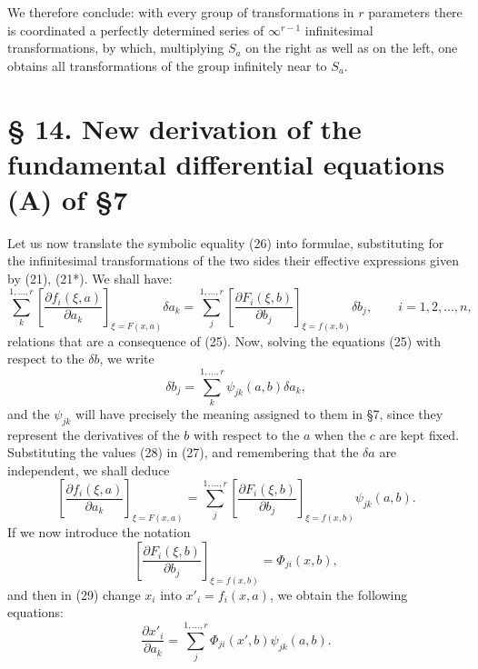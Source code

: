 \documentclass[11pt]{book}
\begin{document}
We therefore conclude: with every group of transformations in $r$ parameters there is coordinated a perfectly determined series of $\infty^{r-1}$ infinitesimal transformations, by which, multiplying $S_a$ on the right as well as on the left, one obtains all transformations of the group infinitely near to $S_a$.

\section*{\S{} 14. New derivation of the fundamental differential equations (A) of \S{}7}

Let us now translate the symbolic equality (26) into formulae, substituting for the infinitesimal transformations of the two sides their effective expressions given by (21), (21*). We shall have:
\begin{equation*}\tag{27}
 \sum\limits_k^{1,\ldots,r}\left[\frac{\partial f_i(\xi,a)}{\partial a_k}\right]_{\xi=F(x,a)}\delta a_k
 =
 \sum\limits_j^{1,\ldots,r}\left[\frac{\partial F_i(\xi,b)}{\partial b_j}\right]_{\xi=f(x,b)}\delta b_j,
 \qquad i=1,2,\ldots,n,
\end{equation*}
relations that are a consequence of (25). Now, solving the equations (25) with respect to the $\delta b$, we write
\begin{equation*}\tag{28}
 \delta b_j=\sum\limits_k^{1,\ldots,r}\psi_{jk}(a,b)\delta a_k,
\end{equation*}
and the $\psi_{jk}$ will have precisely the meaning assigned to them in \S{}7, since they represent the derivatives of the $b$ with respect to the $a$ when the $c$ are kept fixed. Substituting the values (28) in (27), and remembering that the $\delta a$ are independent, we shall deduce
\begin{equation*}\tag{29}
 \left[\frac{\partial f_i(\xi,a)}{\partial a_k}\right]_{\xi=F(x,a)}
 =
 \sum\limits_j^{1,\ldots,r}\left[\frac{\partial F_i(\xi,b)}{\partial b_j}\right]_{\xi=f(x,b)}\psi_{jk}(a,b).
\end{equation*}
If we now introduce the notation
\begin{equation*}\tag{a}
 \left[\frac{\partial F_i(\xi,b)}{\partial b_j}\right]_{\xi=f(x,b)}=\Phi_{ji}(x,b),
\end{equation*}
and then in (29) change $x_i$ into $x'_i=f_i(x,a)$, we obtain the following equations:
\begin{equation*}\tag{30}
 \frac{\partial x'_i}{\partial a_k}=\sum\limits_j^{1,\ldots,r}\Phi_{ji}(x',b)\psi_{jk}(a,b).
\end{equation*}
\end{document}
